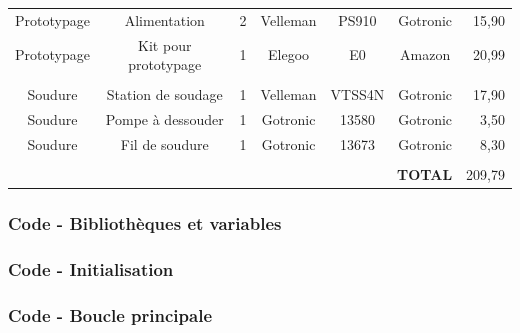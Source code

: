 \documentclass{beamer}
\begin{document}
\begin{frame}
\begin{center}
\begin{tiny}
\begin{tabular}{ccccccr}
Prototypage & Alimentation & 2 & Velleman & PS910 & Gotronic & 15,90 \\
Prototypage & Kit pour prototypage & 1 & Elegoo & E0 & Amazon & 20,99 \\
 & & & & & & \\
Soudure & Station de soudage & 1 & Velleman & VTSS4N & Gotronic & 17,90 \\
Soudure & Pompe à dessouder & 1 & Gotronic & 13580 & Gotronic & 3,50 \\
Soudure & Fil de soudure & 1 & Gotronic & 13673 & Gotronic & 8,30 \\
 & & & & & & \\
\hline
\multicolumn{6}{r}{\bf TOTAL} & 209,79 \\
\hline
\end{tabular}
\end{tiny}
\end{center}
\end{frame}



\begin{scriptsize}
\begin{frame}[fragile]
\frametitle{Code - Bibliothèques et variables}

\end{frame}
\begin{frame}[fragile]
\frametitle{Code - Initialisation}

\end{frame}
\begin{frame}[fragile]
\frametitle{Code - Boucle principale}

\end{frame}
\end{scriptsize}
\end{document}
